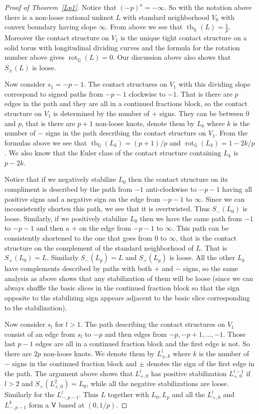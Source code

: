 \documentclass[11pt]{amsart}
\theoremstyle{plain}
\theoremstyle{definition}
\theoremstyle{remark}
\numberwithin{theorem}{section}
\newcommand{\Q}{\mathbb{Q}}           %
\DeclareMathOperator\tb{tb}                   %
\DeclareMathOperator\rot{rot}                 %
\begin{document}
\begin{proof}[Proof of Theorem~\ref{Lp1}]
Notice that $(-p)^a=-\infty$. So with the notation above there is a non-loose rational unknot $L$ with standard neighborhood $V_0$ with convex boundary having slope $\infty$. From above we see that $\tb_\Q(L)=\frac 1p$. Moreover the contact structure on $V_1$ is the unique tight contact structure on a solid torus with longitudinal dividing curves and the formula for the rotation number above gives $\rot_\Q(L)=0$. Our discussion above also shows that $S_\pm(L)$ is loose. 

Now consider $s_1=-p-1$. The contact structures on $V_1$ with this dividing slope correspond to signed paths from $-p-1$ clockwise to $-1$. That is there are $p$ edges in the path and they are all in a continued fractions block, so the contact structure on $V_1$ is determined by the number of $+$ signs. They can be between $0$ and $p$, that is there are $p+1$ non-loose knots, denote them by $L_k$ where $k$ is the number of $-$ signs in the path describing the contact structure on $V_1$. From the formulas above we see that $\tb_\Q(L_k)=(p+1)/p$ and $\rot_\Q(L_k)=1-2k/p$. We also know that the Euler class of the contact structure containing $L_k$ is $p-2k$. 

Notice that if we negatively stabilize $L_0$ then the contact structure on its compliment is described by the path from $-1$ anti-clockwise to $-p-1$ having all positive signs and a negative sign on the edge from $-p-1$ to $\infty$. Since we can inconsistently shorten this path, we see that it is overtwisted. Thus $S_-(L_0)$ is loose. Similarly, if we positively stabilize $L_0$ then we have the same path from $-1$ to $-p-1$ and then a $+$ on the edge from $-p-1$ to $\infty$. This path can be consistently shortened to the one that goes from $0$ to $\infty$, that is the contact structure on the complement of the standard neighborhood of $L$. That is $S_+(L_0)=L$. Similarly $S_-(L_p)=L$ and $S_+(L_p)$ is loose. All the other $L_k$ have complements described by paths with both $+$ and $-$ signs, so the same analysis as above shows that any stabilization of them will be loose (since we can always shuffle the basic slices in the continued fraction block so that the sign opposite to  the stabilizing sign appears adjacent to the basic slice corresponding to the stabilization). 

Now consider $s_l$ for $l>1$. The path describing the contact structures on $V_1$ consist of an edge from $s_l$ to $-p$ and then edges from $-p, -p+1, \ldots, -1$. Those last $p-1$ edges are all in a continued fraction block and the first edge is not. So there are $2p$ non-loose knots. We denote them by $L^l_{\pm,k}$ where $k$ is the number of $-$ signs in the continued fraction block and $\pm$ denotes the sign of the first edge in the path. The argument above shows that $L^l_{+,0}$ has positive stabilization $L^{l-1}_{+,0}$ if $l>2$ and $S_+(L^2_{+,0})=L_0$, while all the negative stabilizations are loose. Similarly for the $L^l_{-,p-1}$. Thus $L$ together with $L_0, L_p$ and all the $L^l_{+,0}$ and $L^k_{-,p-1}$ form a $\normalfont\textsf{V}$ based at $(0,1/p)$. 


\end{proof}
\end{document}
